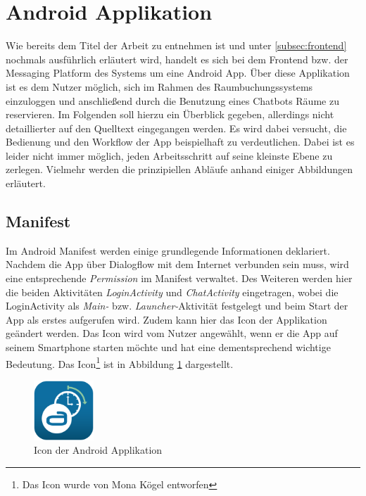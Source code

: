 \clearpage
\section{Android Applikation}
\label{sec:android-applikation}

Wie bereits dem Titel der Arbeit zu entnehmen ist und unter \ref{subsec:frontend} nochmals ausführlich erläutert wird, handelt es sich bei dem Frontend bzw. der Messaging Platform des Systems um eine Android App. Über diese Applikation ist es dem Nutzer möglich, sich im Rahmen des Raumbuchungssystems einzuloggen und anschließend durch die Benutzung eines Chatbots Räume zu reservieren. Im Folgenden soll hierzu ein Überblick gegeben, allerdings nicht detaillierter auf den Quelltext eingegangen werden. Es wird dabei versucht, die Bedienung und den Workflow der App beispielhaft zu verdeutlichen. Dabei ist es leider nicht immer möglich, jeden Arbeitsschritt auf seine kleinste Ebene zu zerlegen. Vielmehr werden die prinzipiellen Abläufe anhand einiger Abbildungen erläutert.

\subsection{Manifest}
\label{subsec:manifest}

Im Android Manifest werden einige grundlegende Informationen deklariert. Nachdem die App über Dialogflow mit dem Internet verbunden sein muss, wird eine entsprechende \textit{Permission} im Manifest verwaltet. Des Weiteren werden hier die beiden Aktivitäten \textit{LoginActivity} und \textit{ChatActivity} eingetragen, wobei die LoginActivity als \textit{Main-} bzw. \textit{Launcher-}Aktivität festgelegt und beim Start der App als erstes aufgerufen wird. Zudem kann hier das Icon der Applikation geändert werden. Das Icon wird vom Nutzer angewählt, wenn er die App auf seinem Smartphone starten möchte und hat eine dementsprechend wichtige Bedeutung. Das Icon\footnote{Das Icon wurde von Mona Kögel entworfen} ist in Abbildung \ref{fig:android-app-icon} dargestellt.
\newline

\begin{figure}[H]
    \centering
    \includegraphics[width=0.2\textwidth]{bilder/AppIcon.png}
    \caption{Icon der Android Applikation}
    \label{fig:android-app-icon}
\end{figure}

